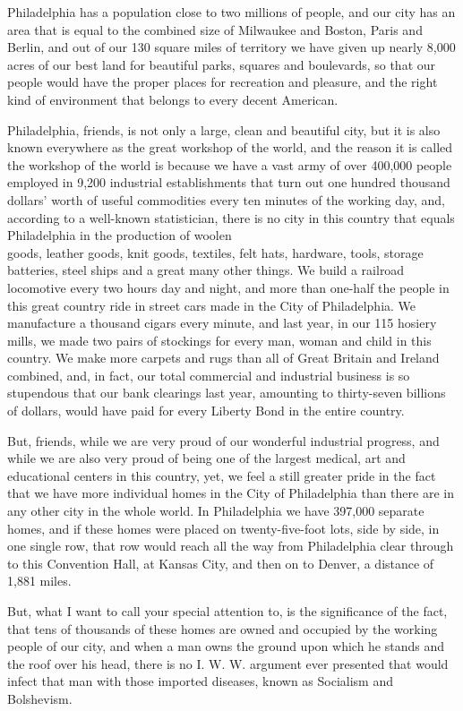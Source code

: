 \documentclass[10pt]{article}
\begin{document}
Philadelphia has a population close to two millions of people, and our city has an area that is equal to the combined size of Milwaukee and Boston, Paris and Berlin, and out of our 130 square miles of territory we have given up nearly 8,000 acres of our best land for beautiful parks, squares and boulevards, so that our people would have the proper places for recreation and pleasure, and the right kind of environment that belongs to every decent American.

Philadelphia, friends, is not only a large, clean and beautiful city, but it is also known everywhere as the great workshop of the world, and the reason it is called the workshop of the world is because we have a vast army of over 400,000 people employed in 9,200 industrial establishments that turn out one hundred thousand dollars' worth of useful commodities every ten minutes of the working day, and, according to a well-known statistician, there is no city in this country that equals Philadelphia in the production of woolen\\
goods, leather goods, knit goods, textiles, felt hats, hardware, tools, storage batteries, steel ships and a great many other things. We build a railroad locomotive every two hours day and night, and more than one-half the people in this great country ride in street cars made in the City of Philadelphia. We manufacture a thousand cigars every minute, and last year, in our 115 hosiery mills, we made two pairs of stockings for every man, woman and child in this country. We make more carpets and rugs than all of Great Britain and Ireland combined, and, in fact, our total commercial and industrial business is so stupendous that our bank clearings last year, amounting to thirty-seven billions of dollars, would have paid for every Liberty Bond in the entire country.

But, friends, while we are very proud of our wonderful industrial progress, and while we are also very proud of being one of the largest medical, art and educational centers in this country, yet, we feel a still greater pride in the fact that we have more individual homes in the City of Philadelphia than there are in any other city in the whole world. In Philadelphia we have 397,000 separate homes, and if these homes were placed on twenty-five-foot lots, side by side, in one single row, that row would reach all the way from Philadelphia clear through to this Convention Hall, at Kansas City, and then on to Denver, a distance of 1,881 miles.

But, what I want to call your special attention to, is the significance of the fact, that tens of thousands of these homes are owned and occupied by the working people of our city, and when a man owns the ground upon which he stands and the roof over his head, there is no I. W. W. argument ever presented that would infect that man with those imported diseases, known as Socialism and Bolshevism.
\end{document}
